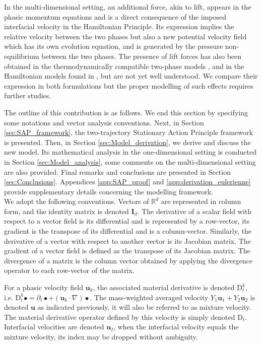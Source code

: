 \documentclass{myclass}
\newcommand{\Dt}{\mathrm{D}_t}
\newcommand{\Id}{\mathbf{I}_d}
\newcommand{\vel}{\bm{u}}
\begin{document}
In the multi-dimensional setting, an additional force, akin to lift, appears in the phasic momentum equations and is a direct consequence of the imposed interfacial velocity in the Hamiltonian Principle. Its expression implies the relative velocity between the two phases but also a new potential velocity field which has its own evolution equation, and is generated by the pressure non-equilibrium between the two phases. The presence of lift forces has also been obtained in the thermodynamically compatible two-phase models \cite{romenski:2004, romenski:2007, romenski:2010}, and in the Hamiltonian models found in \cite{gavrilyuk:2020}, but are not yet well understood. We compare their expression in both formulations but the proper modelling of such effects requires further studies.

The outline of this contribution is as follows. We end this section by specifying some notations and vector analysis conventions. Next, in Section \ref{sec:SAP_framework}, the two-trajectory Stationary Action Principle framework is presented. Then, in Section \ref{sec:Model_derivation}, we derive and discuss the new model. Its mathematical analysis in the one-dimensional setting is conducted in Section \ref{sec:Model_analysis}, some comments on the multi-dimensional setting are also provided. Final remarks and conclusions are presented in Section \ref{sec:Conclusions}. Appendices \ref{app:SAP_proof} and \ref{app:derivation_eulerienne} provide supplementary details concerning the modelling framework.\\

We adopt the following conventions. Vectors of $\mathbb{R}^d$ are represented in column form, and the identity matrix is denoted $\Id$. The derivative of a scalar field with respect to a vector field is its differential and is represented by a row-vector, its gradient is the transpose of its differential and is a column-vector. Similarly, the derivative of a vector with respect to another vector is its Jacobian matrix. The gradient of a vector field is defined as the transpose of its Jacobian matrix. The divergence of a matrix is the column vector obtained by applying the divergence operator to each row-vector of the matrix.

For a phasic velocity field $\vel_k$, the associated material derivative is denoted $\Dt^k$, i.e. $\Dt^k\bullet = \partial_t\bullet + (\vel_k\cdot\nabla)\bullet$. The mass-weighted averaged velocity $Y_1\vel_1 + Y_2 \vel_2$ is denoted $\vel$ as indicated previously, it will also be referred to as mixture velocity. The material derivative operator defined by this velocity is simply denoted $\Dt$. Interfacial velocities are denoted $\vel_I$, when the interfacial velocity equals the mixture velocity, its index may be dropped without ambiguity.
 
\end{document}
